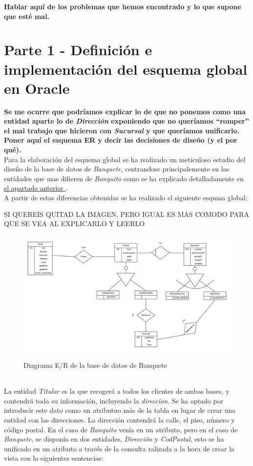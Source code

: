 \documentclass{article}
\begin{document}
\textbf{Hablar aquí de los problemas que hemos encontrado y lo que supone que esté mal.}

\section{Parte 1 - Definición e implementación del esquema global en Oracle}

\textbf{Se me ocurre que podríamos explicar lo de que no ponemos como una entidad aparte lo de \emph{Dirección} exponiendo que no queríamos ``romper'' el mal trabajo que hicieron con \emph{Sucursal} y que queríamos unificarlo.}
\textbf{Poner aquí el esquema ER y decir las decisiones de diseño (y el por qué).}\\

Para la elaboración del esquema global se ha realizado un meticuloso estudio del diseño de la base de datos de \emph{Banquete}, centrandose principalemente en las entidades que mas difieren de \emph{Banquito} como se ha explicado detalladamente en \hyperref[mejoras]{el apartado anterior }.\\
A partir de estas diferencias obtenidas se ha realizado el siguiente esquma global:\\
\begin{huge}
SI QUEREIS QUITAD LA IMAGEN, PERO IGUAL ES MAS COMODO PARA QUE SE VEA AL EXPLICARLO Y LEERLO\\
\end{huge}
\begin{figure}
\centering
\includegraphics[scale=0.55]{images/DiagramaGLOBAL.png}
\label{fig:er_banquete}
\caption{Diagrama E/R de la base de datos de Banquete}
\end{figure}\\

La entidad \emph{Titular} es la que recogerá a todos los clientes de ambas bases, y contendrá toda su información, incluyendo la \textit{direccion}. Se ha optado por introducir este dato como un atributuo más de la tabla en lugar de crear una entidad con las direcciones. La dirección contendrá la calle, el piso, número y código postal. En el caso de \emph{Banquito} venía en un atributo, pero en el caso de \emph{Banquete}, se disponía en dos entidades, \textit{Dirección} y \textit{CodPostal}, esto se ha unificado en un atributo a través de la consulta ralizada a la hora de crear la vista con la siguientes sentencias:
\end{document}
